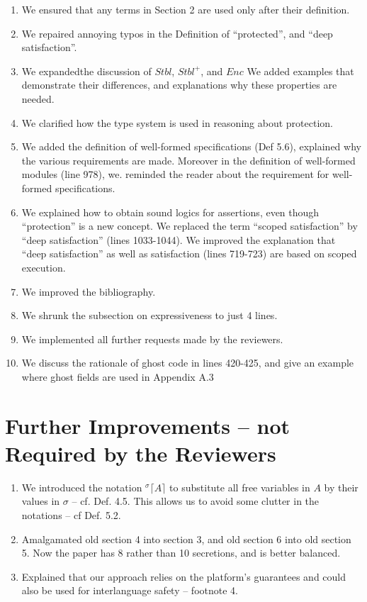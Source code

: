 \documentclass{article}
\begin{document}
\begin{enumerate}
\item
We ensured that any terms in Section 2 are used only after their definition.
\item
We repaired annoying typos in the Definition of “protected”, and “deep satisfaction”.
\item
We expandedthe discussion of $Stbl$, $Stbl^+$, and  $Enc$ We added examples that demonstrate their differences, and explanations why these properties are needed.
\item
We clarified how the type system is used in reasoning about protection.
\item
We added the definition of well-formed specifications (Def 5.6), explained why the various requirements are made. Moreover in the definition of well-formed modules (line 978), we. reminded the reader about the requirement for well-formed specifications. 
\item
We explained how to obtain sound logics for assertions, even though “protection” is a new concept.
We replaced the term “scoped satisfaction” by “deep satisfaction” (lines 1033-1044). We improved the explanation that “deep satisfaction” as well as satisfaction (lines 719-723) are based on scoped execution. 
\item
We improved the bibliography.
\item
We shrunk the subsection on expressiveness to just 4 lines.
\item
We implemented all further  requests made by the reviewers.
\item We discuss the rationale of ghost code in lines 420-425, and give an example where ghost fields are used in Appendix A.3
\end{enumerate}


\section{Further Improvements -- not Required by the Reviewers }
\begin{enumerate}
\item
We introduced the notation $^\sigma\lceil A\rceil$ to substitute all free variables in $A$  by their values in $\sigma$ -- cf. Def. 4.5. This allows us to avoid some clutter in the notations -- cf Def. 5.2.
\item
Amalgamated old section 4 into section 3, and old section 6 into old section 5. Now the paper has 8 rather than 10 secretions, and is better balanced.
\item
Explained that our approach relies on the platform’s guarantees and could also be used for interlanguage safety -- footnote 4.
\end{enumerate}  
\end{document}
